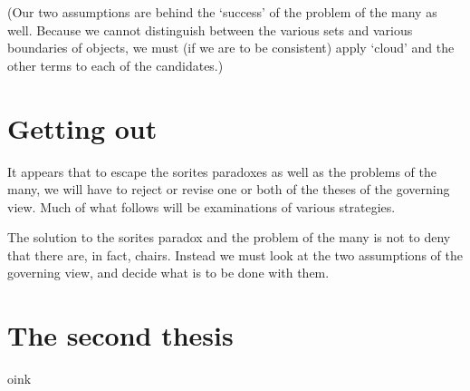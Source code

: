 \documentclass[11pt]{standalone}
\begin{document}
\begin{spacing}{1.5}
(Our two assumptions are behind the `success' of the problem of the
many as well.  Because we cannot distinguish between the various sets
and various boundaries of objects, we must (if we are to be
consistent) apply `cloud' and the other terms to each of the
candidates.)

\section{Getting out}
It appears that to escape the sorites paradoxes as well as the
problems of the many, we will have to reject or revise one or both of
the theses of the governing view.  Much of what follows will be
examinations of various strategies.

\hline

The solution to the sorites paradox and the problem of the many is not
to deny that there are, in fact, chairs.  Instead we must look at the
two assumptions of the governing view, and decide what is to be done
with them.

\section{The second thesis}
oink

\ifstandalone
\end{spacing}


\fi
\end{document}
